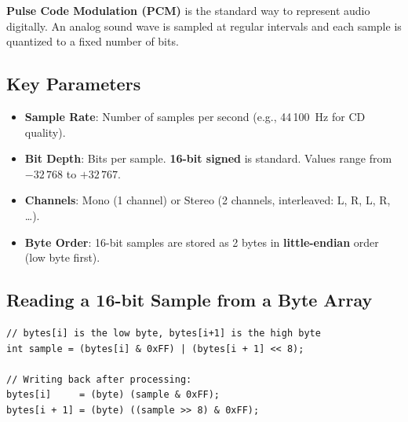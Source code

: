 \documentclass[a4paper,12pt]{article}
\begin{document}
\textbf{Pulse Code Modulation (PCM)} is the standard way to represent audio digitally.
An analog sound wave is sampled at regular intervals and each sample is quantized to a fixed number of bits.

\begin{center}
\end{center}

\subsection{Key Parameters}

\begin{itemize}
    \item \textbf{Sample Rate}: Number of samples per second (e.g., 44\,100~Hz for CD quality).
    \item \textbf{Bit Depth}: Bits per sample. \textbf{16-bit signed} is standard.
          Values range from $-32\,768$ to $+32\,767$.
    \item \textbf{Channels}: Mono (1 channel) or Stereo (2 channels, interleaved: L, R, L, R, \ldots).
    \item \textbf{Byte Order}: 16-bit samples are stored as 2 bytes in \textbf{little-endian} order
          (low byte first).
\end{itemize}

\subsection{Reading a 16-bit Sample from a Byte Array}

\begin{lstlisting}
// bytes[i] is the low byte, bytes[i+1] is the high byte
int sample = (bytes[i] & 0xFF) | (bytes[i + 1] << 8);

// Writing back after processing:
bytes[i]     = (byte) (sample & 0xFF);
bytes[i + 1] = (byte) ((sample >> 8) & 0xFF);
\end{lstlisting}
\end{document}
